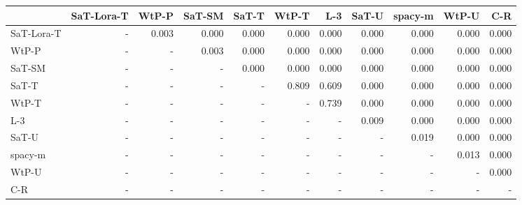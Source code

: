 \begin{tabular}{lrrrrrrrrrr}
\toprule
 & SaT-Lora-T & WtP-P & SaT-SM & SaT-T & WtP-T & L-3 & SaT-U & spacy-m & WtP-U & C-R \\
\midrule
SaT-Lora-T & - & 0.003 & 0.000 & 0.000 & 0.000 & 0.000 & 0.000 & 0.000 & 0.000 & 0.000 \\
WtP-P & - & - & 0.003 & 0.000 & 0.000 & 0.000 & 0.000 & 0.000 & 0.000 & 0.000 \\
SaT-SM & - & - & - & 0.000 & 0.000 & 0.000 & 0.000 & 0.000 & 0.000 & 0.000 \\
SaT-T & - & - & - & - & 0.809 & 0.609 & 0.000 & 0.000 & 0.000 & 0.000 \\
WtP-T & - & - & - & - & - & 0.739 & 0.000 & 0.000 & 0.000 & 0.000 \\
L-3 & - & - & - & - & - & - & 0.009 & 0.000 & 0.000 & 0.000 \\
SaT-U & - & - & - & - & - & - & - & 0.019 & 0.000 & 0.000 \\
spacy-m & - & - & - & - & - & - & - & - & 0.013 & 0.000 \\
WtP-U & - & - & - & - & - & - & - & - & - & 0.000 \\
C-R & - & - & - & - & - & - & - & - & - & - \\
\bottomrule
\end{tabular}

